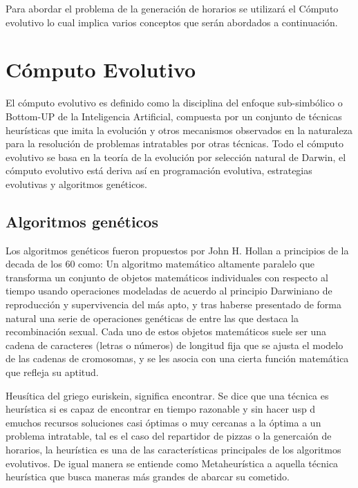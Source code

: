 \label{sec:marcoTeo}
	
	Para abordar el problema de la generación de horarios se utilizará el Cómputo evolutivo lo cual implica varios conceptos que serán abordados a continuación.

	\section{Cómputo Evolutivo}
		
		El cómputo evolutivo es definido como la disciplina del enfoque sub-simbólico o Bottom-UP de la Inteligencia Artificial, compuesta por un conjunto de técnicas heurísticas que imita la evolución y otros mecanismos observados en la naturaleza para la resolución de problemas intratables por otras técnicas. Todo el cómputo evolutivo se basa en la teoría de la evolución por selección natural de Darwin, el cómputo evolutivo está deriva así en programación evolutiva, estrategias evolutivas y algoritmos genéticos.

		\subsection{Algoritmos genéticos}
		Los algoritmos genéticos fueron propuestos por John H. Hollan a principios de la decada de los 60 como: 
			Un algoritmo matemático altamente paralelo que transforma un conjunto de objetos matemáticos individuales con respecto al tiempo usando operaciones modeladas de acuerdo al principio Darwiniano de reproducción y supervivencia del más apto, y tras haberse presentado de forma natural una serie de operaciones genéticas de entre las que destaca la recombinación sexual. Cada uno de estos objetos matemáticos suele ser una cadena de caracteres (letras o números) de longitud fija que se ajusta el modelo de las cadenas de cromosomas, y se les asocia con una cierta función matemática que refleja su aptitud.
		
		Heusítica del griego euriskein, significa encontrar. Se dice que una técnica es heurística si es capaz de encontrar en tiempo razonable y sin hacer usp d emuchos recursos soluciones casi óptimas o muy cercanas a la óptima a un problema intratable, tal es el caso del repartidor de pizzas o la genercaión de horarios, la heurística es una de las características principales de los algoritmos evolutivos. De igual manera se entiende como Metaheurística a aquella técnica heurística que busca maneras más grandes de abarcar su cometido.

